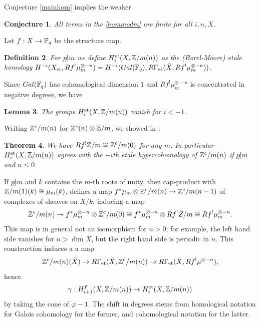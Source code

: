 \documentclass[nospthms,envcountsect]{svmult} %
\newtheorem{theorem}                    {Theorem}       [section]
\newtheorem{lemma}      [theorem]       {Lemma}
\newtheorem{definition} [theorem]       {Definition}
\newtheorem{conjecture} [theorem]       {Conjecture}
\begin{document}
Conjecture \ref{mainhom} implies the weaker

\begin{conjecture}\label{finitehom}
All terms in the \eqref{hommodm} are finite for all $i, n, X$.
\end{conjecture}




Let $f:X\to {{\mathbb F}}_q$ be the structure map.

\begin{definition}
For $p\not|m$ we define $H^{\text{\rm et}}_i(X,{{\mathbb Z}}/m(n))$ as the (Borel-Moore)
etale homology 
$H^{-i}(X_{\text{\rm et}},Rf^!\mu_m^{\otimes -n})=
H^{-i}(Gal({{\mathbb F}}_q),R\Gamma_{\text{\rm et}}(\bar X, Rf^!\mu_m^{\otimes -n}))$.
\end{definition}

Since $Gal({{\mathbb F}}_q)$ has cohomological dimension $1$ and 
$Rf^!\mu_m^{\otimes -n}$ is concentrated in negative degrees, we have

\begin{lemma}
The groups $H^{\text{\rm et}}_i(X,{{\mathbb Z}}/m(n))$ vanish for $i<-1$.
\end{lemma}

Writing ${{\mathbb Z}}^c/m(n)$ for ${{\mathbb Z}}^c(n)\otimes {{\mathbb Z}}/m$, we showed in  
\cite{ichduality}:

\begin{theorem}\label{dduuaall}
We have $Rf^!{{\mathbb Z}}/m \cong {{\mathbb Z}}^c/m(0)$ for any $m$. In particular
$H^{\text{\rm et}}_i(X,{{\mathbb Z}}/m(n))$ agrees with the $-i$th etale hypercohomology of 
${{\mathbb Z}}^c/m(n)$ if $p\not|m$ and $n\leq 0$.
\end{theorem}


If $p\not| m$ and $k$ contains the
$m$-th roots of unity, then cap-product with ${{\mathbb Z}}/m(1)(k)\cong \mu_m(k)$,  
defines a map $f^*\mu_m\otimes{{\mathbb Z}}^c/m(n)\to {{\mathbb Z}}^c/m(n-1)$
of complexes of sheaves on $X/k$, inducing a map
$$ {{\mathbb Z}}^c/m(n)\to f^*\mu^{\otimes -n}_m\otimes {{\mathbb Z}}^c/m(0)
\cong f^* \mu^{\otimes -n}_m\otimes Rf^!Z/m \cong Rf^!\mu^{\otimes -n}_m.$$
This map is in general not an isomorphism for $n>0$;  for example,
the left hand side vanishes for $n>\dim X$, but the right hand side
is periodic in $n$.
This construction induces a a map 
$$ {{\mathbb Z}}^c/m(n)(\bar X) \to R\Gamma_{\text{\rm et}}(\bar X, {{\mathbb Z}}^c/m(n))\to 
R\Gamma_{\text{\rm et}}(\bar X,Rf^!\mu^{\otimes -n}),$$
hence 
$$\gamma: H_{i+1}^F(X,{{\mathbb Z}}/m(n))\to H_i^{\text{\rm et}}(X,{{\mathbb Z}}/m(n))$$
by taking the cone of $\varphi-1$. 
The shift in degrees stems
from homological notation for Galois cohomology for the former, 
and cohomological notation for the latter. 
\end{document}
